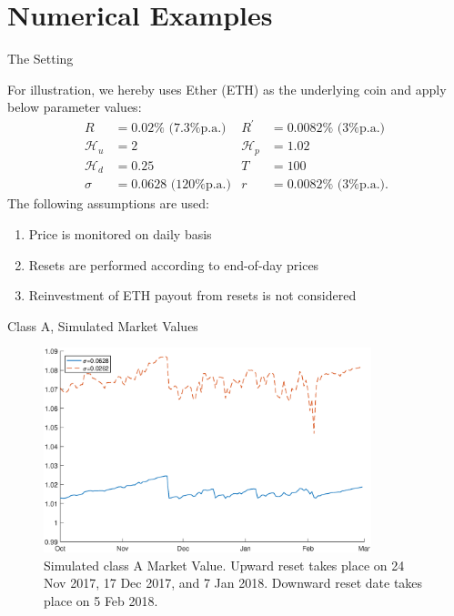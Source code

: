 \documentclass[notes=show, beamer, handout]{beamer}
\begin{document}
\section{Numerical Examples}


\begin{frame}{The Setting}

For illustration, we hereby uses Ether (ETH) as the underlying coin
and apply below parameter values:
\begin{align*}
R& =0.02\% \text{ (7.3\% p.a.)} & R^\prime & = 0.0082\% \text{ (3\% p.a.)}\\
\mathcal{H}_{u} & =2 & \mathcal{H}_{p} & =1.02\\
\mathcal{H}_{d} & =0.25 & T &= 100\\
\sigma &= 0.0628 \text{ (120\% p.a.)} & r&=0.0082\% \text{ (3\% p.a.)}.
\end{align*}
The following assumptions are used:
\begin{enumerate}
\item Price is monitored on daily basis
\item Resets are performed according to end-of-day prices
\item Reinvestment of ETH payout from resets is not considered
\end{enumerate}

\end{frame}



\begin{frame}{Class A, Simulated Market Values}

\begin{figure}[htb]
\begin{centering}
\includegraphics[width=0.85\textwidth]{WA.eps}
\par\end{centering}
\caption{Simulated class A Market Value.  Upward reset takes place on 24 Nov 2017, 17 Dec 2017, and 7 Jan 2018. Downward reset date takes place on 5 Feb 2018.}\label{fig:valA}
\end{figure}

\end{frame}
\end{document}
